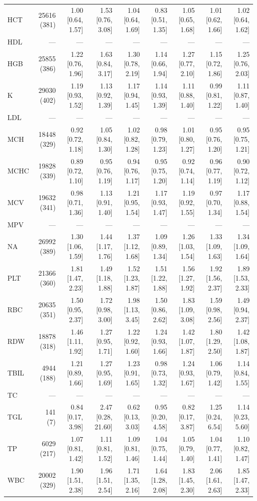 \begin{table}[ht]
\begin{tabular}{lrrrrrrrr}
HCT & 25616 (381) & 1.00 [0.64, 1.57] & 1.53 [0.76, 3.08] & 1.04 [0.64, 1.69] & 0.83 [0.51, 1.35] & 1.05 [0.65, 1.68] & 1.01 [0.62, 1.66] & 1.02 [0.64, 1.62] \\
HDL & --- & --- & --- & --- & --- & --- & --- & --- \\
HGB & 25855 (386) & 1.22 [0.76, 1.96] & 1.63 [0.84, 3.17] & 1.30 [0.78, 2.19] & 1.14 [0.66, 1.94] & 1.27 [0.77, 2.10] & 1.15 [0.72, 1.86] & 1.25 [0.76, 2.03] \\
K & 29030 (402) & 1.19 [0.93, 1.52] & 1.13 [0.92, 1.39] & 1.17 [0.94, 1.45] & 1.14 [0.93, 1.39] & 1.11 [0.88, 1.40] & 0.99 [0.81, 1.22] & 1.11 [0.87, 1.40] \\
LDL & --- & --- & --- & --- & --- & --- & --- & --- \\
MCH & 18448 (329) & 0.92 [0.72, 1.18] & 1.05 [0.84, 1.30] & 1.02 [0.82, 1.28] & 0.98 [0.79, 1.23] & 1.01 [0.80, 1.27] & 0.95 [0.76, 1.20] & 0.95 [0.75, 1.21] \\
MCHC & 19828 (339) & 0.89 [0.72, 1.10] & 0.95 [0.76, 1.19] & 0.94 [0.76, 1.17] & 0.95 [0.75, 1.20] & 0.92 [0.74, 1.14] & 0.96 [0.77, 1.19] & 0.90 [0.72, 1.12] \\
MCV & 19632 (341) & 0.98 [0.71, 1.36] & 1.13 [0.91, 1.40] & 1.21 [0.95, 1.54] & 1.17 [0.93, 1.47] & 1.19 [0.92, 1.55] & 0.97 [0.70, 1.34] & 1.17 [0.88, 1.54] \\
MPV & --- & --- & --- & --- & --- & --- & --- & --- \\
NA & 26992 (389) & 1.30 [1.06, 1.59] & 1.44 [1.17, 1.76] & 1.37 [1.12, 1.68] & 1.09 [0.89, 1.34] & 1.26 [1.03, 1.54] & 1.33 [1.09, 1.63] & 1.34 [1.09, 1.64] \\
PLT & 21366 (360) & 1.81 [1.47, 2.23] & 1.49 [1.18, 1.88] & 1.52 [1.23, 1.87] & 1.51 [1.22, 1.88] & 1.56 [1.27, 1.92] & 1.92 [1.56, 2.37] & 1.89 [1.53, 2.33] \\
RBC & 20635 (351) & 1.50 [0.95, 2.37] & 1.72 [0.98, 3.00] & 1.98 [1.13, 3.45] & 1.50 [0.86, 2.62] & 1.83 [1.09, 3.08] & 1.59 [0.98, 2.56] & 1.49 [0.94, 2.37] \\
RDW & 18878 (318) & 1.46 [1.11, 1.92] & 1.27 [0.95, 1.71] & 1.22 [0.92, 1.60] & 1.24 [0.93, 1.66] & 1.42 [1.07, 1.87] & 1.80 [1.29, 2.50] & 1.42 [1.08, 1.87] \\
TBIL & 4944 (188) & 1.21 [0.89, 1.66] & 1.27 [0.95, 1.69] & 1.23 [0.91, 1.65] & 0.98 [0.73, 1.32] & 1.24 [0.93, 1.67] & 1.06 [0.79, 1.42] & 1.14 [0.84, 1.55] \\
TC & --- & --- & --- & --- & --- & --- & --- & --- \\
TGL & 141 (7) & 0.84 [0.17, 3.98] & 2.47 [0.28, 21.60] & 0.62 [0.13, 3.03] & 0.95 [0.20, 4.58] & 0.82 [0.17, 3.87] & 1.25 [0.24, 6.54] & 1.14 [0.23, 5.60] \\
TP & 6029 (217) & 1.07 [0.81, 1.42] & 1.11 [0.81, 1.52] & 1.09 [0.81, 1.46] & 1.04 [0.75, 1.44] & 1.05 [0.79, 1.40] & 1.04 [0.77, 1.41] & 1.10 [0.82, 1.47] \\
WBC & 20002 (329) & 1.90 [1.51, 2.38] & 1.96 [1.51, 2.54] & 1.71 [1.35, 2.16] & 1.64 [1.28, 2.08] & 1.83 [1.45, 2.30] & 2.06 [1.61, 2.63] & 1.85 [1.47, 2.33] \\
\bottomrule
\end{tabular}
\label{tab:13_cox_eicu_sepsis}
\end{table}